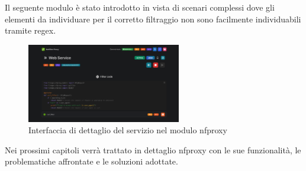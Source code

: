 Il seguente modulo è stato introdotto in vista di scenari complessi dove gli elementi da individuare per il corretto filtraggio non sono facilmente individuabili tramite \gls{regex}.

\begin{figure}[H]
    \centering
    \includegraphics[width=0.6\textwidth]{images/chapter2/NFProxyInterface.png}
    \caption{Interfaccia di dettaglio del servizio nel modulo nfproxy}\label{fig:nfproxy_interface}
\end{figure}

Nei prossimi capitoli verrà trattato in dettaglio \gls{nfproxy} con le sue funzionalità, le problematiche affrontate e le soluzioni adottate.
